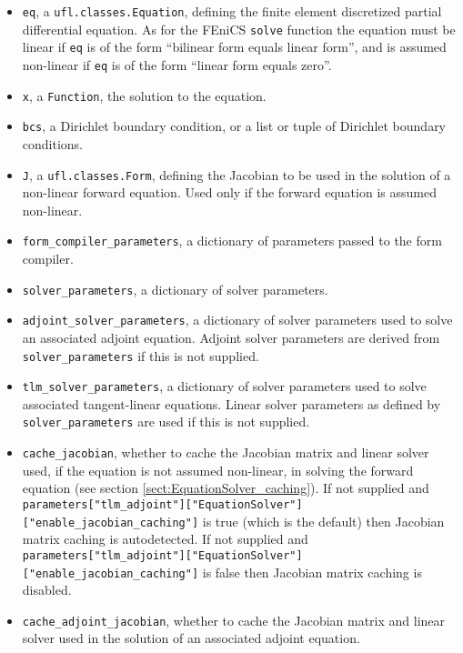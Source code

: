 \documentclass[11pt]{article}
\begin{document}
\begin{itemize}
  \item \texttt{eq}, a \texttt{ufl.classes.Equation}, defining the finite
    element discretized partial differential equation. As for the FEniCS
    \texttt{solve} function the equation must be linear if \texttt{eq} is of
    the form ``bilinear form equals linear form'', and is assumed non-linear if
    \texttt{eq} is of the form ``linear form equals zero''.
  \item \texttt{x}, a \texttt{Function}, the solution to the equation.
  \item \texttt{bcs}, a Dirichlet boundary condition, or a list or tuple of
    Dirichlet boundary conditions.
  \item \texttt{J}, a \texttt{ufl.classes.Form}, defining the Jacobian to be
    used in the solution of a non-linear forward equation. Used only if the
    forward equation is assumed non-linear.
  \item \texttt{form\_compiler\_parameters}, a dictionary of parameters passed
    to the form compiler.
  \item \texttt{solver\_parameters}, a dictionary of solver parameters.
  \item \texttt{adjoint\_solver\_parameters}, a dictionary of solver parameters
    used to solve an associated adjoint equation. Adjoint solver parameters are
    derived from \texttt{solver\_parameters} if this is not supplied.
  \item \texttt{tlm\_solver\_parameters}, a dictionary of solver parameters
    used to solve associated tangent-linear equations. Linear solver parameters
    as defined by \texttt{solver\_parameters} are used if this is not supplied.
  \item \texttt{cache\_jacobian}, whether to cache the Jacobian matrix and
    linear solver used, if the equation is not assumed non-linear, in solving
    the forward equation (see section \ref{sect:EquationSolver_caching}). If
    not supplied and
    \texttt{parameters["tlm\_adjoint"]}\texttt{["EquationSolver"]}\texttt{["enable\_jacobian\_caching"]}
    is true (which is the default) then Jacobian matrix caching is
    autodetected. If not supplied and
    \texttt{parameters["tlm\_adjoint"]}\texttt{["EquationSolver"]}\texttt{["enable\_jacobian\_caching"]}
    is false then Jacobian matrix caching is disabled.
  \item \texttt{cache\_adjoint\_jacobian}, whether to cache the Jacobian matrix
    and linear solver used in the solution of an associated adjoint equation.

\end{itemize}
\end{document}
